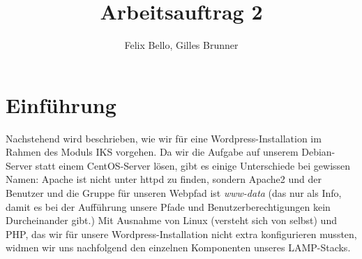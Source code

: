 \documentclass{article}
\author{Felix Bello, Gilles Brunner}
\title{Arbeitsauftrag 2}
\begin{document}
	\maketitle
	\section{Einführung}
	Nachstehend wird beschrieben, wie wir für eine Wordpress-Installation im Rahmen des Moduls IKS vorgehen. Da wir die Aufgabe auf unserem Debian-Server statt einem CentOS-Server lösen, gibt es einige Unterschiede bei gewissen Namen: Apache ist nicht unter httpd zu finden, sondern Apache2 und der Benutzer und die Gruppe für unseren Webpfad ist \textit{www-data} (das nur als Info, damit es bei der Aufführung unsere Pfade und 	Benutzerberechtigungen kein Durcheinander gibt.) Mit Ausnahme von Linux (versteht sich von selbst) und PHP, das wir für unsere Wordpress-Installation nicht extra konfigurieren mussten, widmen wir uns nachfolgend den einzelnen Komponenten unseres LAMP-Stacks.
\end{document}
